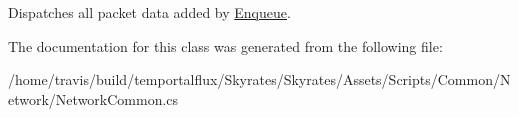 Dispatches all packet data added by \hyperlink{class_skyrates_1_1_common_1_1_network_1_1_packet_dispatcher_a27c614744c8706259d846b8fac24915a}{Enqueue}. 



The documentation for this class was generated from the following file\-:\begin{DoxyCompactItemize}
\item 
/home/travis/build/temportalflux/\-Skyrates/\-Skyrates/\-Assets/\-Scripts/\-Common/\-Network/Network\-Common.\-cs\end{DoxyCompactItemize}
